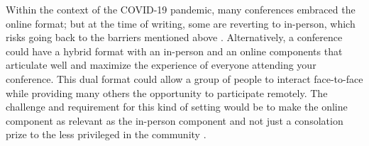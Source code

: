 \documentclass[10pt,letterpaper]{article}
\begin{document}
Within the context of the COVID-19 pandemic, many conferences embraced the online format; but at the time of writing, some are reverting to in-person, which risks going back to the barriers mentioned above \cite{jooKeepOnlineOption2021}.
Alternatively, a conference could have a hybrid format with an in-person and an online components that articulate well and maximize the experience of everyone attending your conference. This dual format could allow a group of people to interact face-to-face while providing many others the opportunity to participate remotely. 
The challenge and requirement for this kind of setting would be to make the online component as relevant as the in-person component and not just a consolation prize to the less privileged in the community \cite{jooKeepOnlineOption2021,ninerBetterWhomLeveling2021}.
\end{document}
